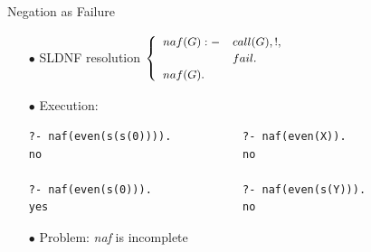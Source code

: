 \documentclass[pdf,slideColor,contemporain]{prosper}
\begin{document}
\begin{slide}{Negation as Failure}
\begin{itemize}

\vspace{-0.2cm}
\item[{\blue $\bullet$}] SLDNF resolution  $
         {\small
         \begin{cases}
         \begin{array}{ll}
              naf(G) :- & call(G),!, \\
                        & fail. \\
              naf(G). &
          \end{array}
          \end{cases}} $\\

\vspace{0.2cm}

\item[{\blue $\bullet$}] Execution:
\begin{tiny}
\begin{verbatim}
?- naf(even(s(s(0)))).           ?- naf(even(X)).
no                               no

?- naf(even(s(0))).              ?- naf(even(s(Y))).
yes                              no
\end{verbatim}
\end{tiny}
\vspace{0.2cm}
\item[$\bullet$] {\blue Problem}: \emph{naf} is {\red incomplete}
\end{itemize}
\end{slide}
\end{document}
